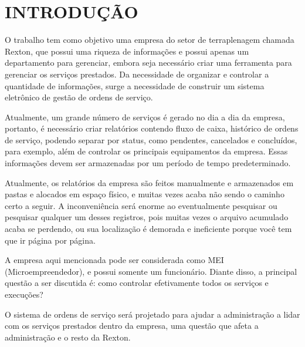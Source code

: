 \chapter*[INTRODUÇÃO]{INTRODUÇÃO}
O trabalho tem como objetivo uma empresa do setor de terraplenagem chamada Rexton, que possui uma riqueza de informações e possui apenas um departamento para gerenciar, embora seja necessário criar uma ferramenta para gerenciar os serviços prestados. Da necessidade de organizar e controlar a quantidade de informações, surge a necessidade de construir um sistema eletrônico de gestão de ordens de serviço.

Atualmente, um grande número de serviços é gerado no dia a dia da empresa, portanto, é necessário criar relatórios contendo fluxo de caixa, histórico de ordens de serviço, podendo separar por status, como pendentes, cancelados e concluídos, para exemplo, além de controlar os principais equipamentos da empresa. Essas informações devem ser armazenadas por um período de tempo predeterminado.

Atualmente, os relatórios da empresa são feitos manualmente e armazenados em pastas e alocados em espaço físico, e muitas vezes acaba não sendo o caminho certo a seguir. A inconveniência será enorme ao eventualmente pesquisar ou pesquisar qualquer um desses registros, pois muitas vezes o arquivo acumulado acaba se perdendo, ou sua localização é demorada e ineficiente porque você tem que ir página por página.

A empresa aqui mencionada pode ser considerada como MEI (Microempreendedor), e possui somente um funcionário. Diante disso, a principal questão a ser discutida é: como controlar efetivamente todos os serviços e execuções?

O sistema de ordens de serviço será projetado para ajudar a administração a lidar com os serviços prestados dentro da empresa, uma questão que afeta a administração e o resto da Rexton.